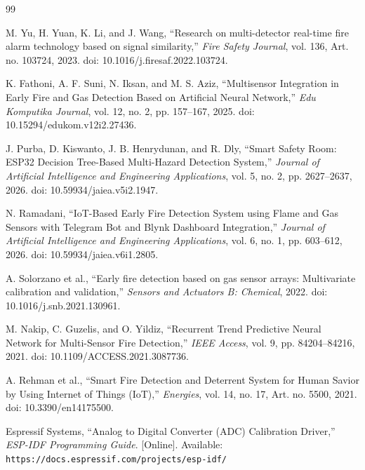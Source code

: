 \documentclass[12pt,a4paper]{article}
\begin{document}
\begin{thebibliography}{99}

M. Yu, H. Yuan, K. Li, and J. Wang,
``Research on multi-detector real-time fire
alarm technology based on signal similarity,''
\textit{Fire Safety Journal},
vol. 136, Art. no. 103724, 2023.
doi: 10.1016/j.firesaf.2022.103724.

K. Fathoni, A. F. Suni, N. Iksan,
and M. S. Aziz,
``Multisensor Integration in Early Fire and Gas
Detection Based on Artificial Neural Network,''
\textit{Edu Komputika Journal},
vol. 12, no. 2, pp. 157--167, 2025.
doi: 10.15294/edukom.v12i2.27436.

J. Purba, D. Kiswanto, J. B. Henrydunan,
and R. Dly,
``Smart Safety Room: ESP32 Decision Tree-Based
Multi-Hazard Detection System,''
\textit{Journal of Artificial Intelligence
and Engineering Applications},
vol. 5, no. 2, pp. 2627--2637, 2026.
doi: 10.59934/jaiea.v5i2.1947.

N. Ramadani,
``IoT-Based Early Fire Detection System using
Flame and Gas Sensors with Telegram Bot and
Blynk Dashboard Integration,''
\textit{Journal of Artificial Intelligence
and Engineering Applications},
vol. 6, no. 1, pp. 603--612, 2026.
doi: 10.59934/jaiea.v6i1.2805.

A. Solorzano et al.,
``Early fire detection based on gas sensor
arrays: Multivariate calibration and validation,''
\textit{Sensors and Actuators B: Chemical}, 2022.
doi: 10.1016/j.snb.2021.130961.

M. Nakip, C. Guzelis, and O. Yildiz,
``Recurrent Trend Predictive Neural Network
for Multi-Sensor Fire Detection,''
\textit{IEEE Access},
vol. 9, pp. 84204--84216, 2021.
doi: 10.1109/ACCESS.2021.3087736.

A. Rehman et al.,
``Smart Fire Detection and Deterrent System
for Human Savior by Using Internet of Things
(IoT),''
\textit{Energies},
vol. 14, no. 17, Art. no. 5500, 2021.
doi: 10.3390/en14175500.

Espressif Systems,
``Analog to Digital Converter (ADC)
Calibration Driver,''
\textit{ESP-IDF Programming Guide}.
[Online]. Available:
\texttt{https://docs.espressif.com/projects/esp-idf/}

\end{thebibliography}
\end{document}
